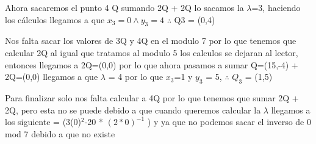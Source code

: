 \documentclass[10pt,a4paper]{article}
\begin{document}
\begin{itemize}
Ahora sacaremos el punto 4 Q sumando 2Q + 2Q lo sacamos la $\lambda$=3, haciendo los cálculos llegamos a que $x_3 =0 \land y_3= 4$ $\therefore$ Q3 = (0,4)\vspace{.3cm}

Nos falta sacar los valores de 3Q y 4Q en el modulo 7 por lo que tenemos que calcular 2Q al igual que tratamos al modulo 5 los calculos se dejaran al lector, entonces llegamos a 2Q=(0,0) por lo que ahora   pasamos a sumar Q=(15,-4) + 2Q=(0,0)  llegamos a que $\lambda$ = 4  por lo que $x_3$=1 y $y_3$ = 5, $\therefore$ $Q_3$ = (1,5) \vspace{.3cm}

Para finalizar solo nos falta calcular a 4Q por lo que tenemos que sumar 2Q + 2Q, pero esta no se puede debido a que cuando queremos calcular la $\lambda$ llegamos a los siguiente = (3(0)$^2$-20 * $(2*0)^{-1}$ ) y ya que no podemos sacar el inverso de 0 mod 7 debido a que no existe  \vspace{.3cm}    






\end{itemize}
\end{document}
